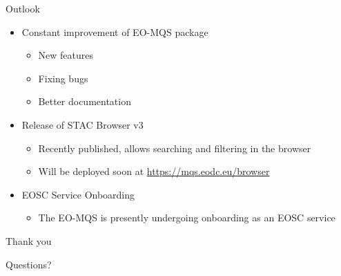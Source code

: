 \documentclass[c,aspectratio=169,14pt]{beamer}
\begin{document}
\begin{frame}{Outlook}
    \begin{itemize}
    \item Constant improvement of EO-MQS package
    \begin{itemize}
        \item New features
        \item Fixing bugs 
        \item Better documentation
    \end{itemize}
    \item Release of STAC Browser v3
    \begin{itemize}
    \item Recently published, allows searching and filtering in the browser
    \item Will be deployed soon at \url{https://mqs.eodc.eu/browser} 
    \end{itemize}
    \item EOSC Service Onboarding
    \begin{itemize}
    \item The EO-MQS is presently undergoing onboarding as an EOSC service
    \end{itemize}
    \end{itemize}
    \end{frame}
\begin{finalframe}
\hfill Thank you\hfill\null

\medskip
\hfill \large Questions?\hfill\null

\end{finalframe}
\end{document}
